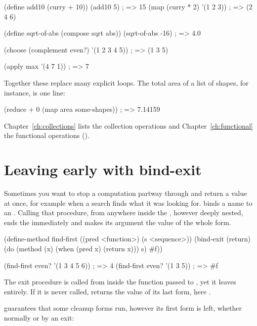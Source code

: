 \begin{dylan}
(define add10 (curry + 10))
(add10 5)                                ; => 15
(map (curry * 2) '(1 2 3))               ; => (2 4 6)

(define sqrt-of-abs (compose sqrt abs))
(sqrt-of-abs -16)                        ; => 4.0

(choose (complement even?) '(1 2 3 4 5)) ; => (1 3 5)

(apply max '(4 7 1))                     ; => 7
\end{dylan}

Together these replace many explicit loops. The total area of a list of
shapes, for instance, is one line:

\begin{dylan}
(reduce + 0 (map area some-shapes))      ; => 7.14159
\end{dylan}

Chapter~\ref{ch:collections} lists the collection operations and
Chapter~\ref{ch:functional} the functional operations
().

\section{Leaving early with bind-exit}\label{sec:tut-exits}

Sometimes you want to stop a computation partway through and return a
value at once, for example when a search finds what it was looking for.
 binds a name to an . Calling that
procedure, from anywhere inside the , however deeply
nested, ends the  immediately and makes its argument the
value of the whole form.

\begin{dylan}
(define-method find-first ((pred <function>) (s <sequence>))
  (bind-exit (return)
    (do (method (x)
          (when (pred x) (return x)))
        s)
    #f))

(find-first even? '(1 3 4 5 6))     ; => 4
(find-first even? '(1 3 5))         ; => #f
\end{dylan}

The exit procedure is called from inside the function passed to
, yet it leaves  entirely. If it is never called,
 returns the value of its last form, here .

 guarantees that some cleanup forms run, however its
first form is left, whether normally or by an exit:

